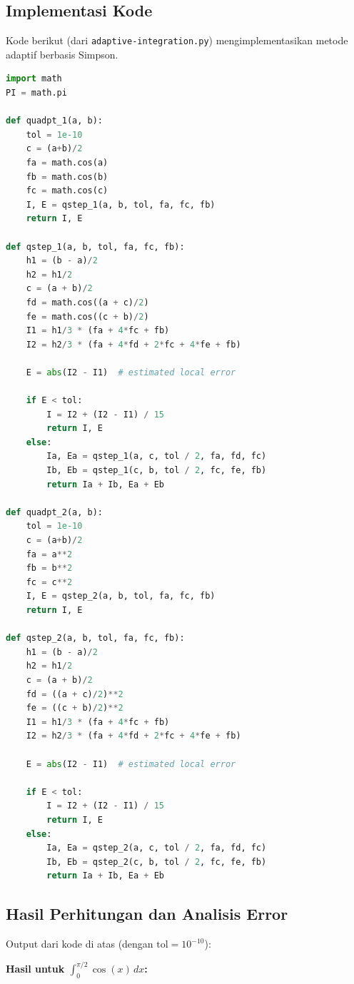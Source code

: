 \documentclass[a4paper, 11pt]{article} %
\begin{document}
\subsection{Implementasi Kode} %
Kode berikut (dari \texttt{adaptive-integration.py}) mengimplementasikan metode adaptif berbasis Simpson. %
\begin{lstlisting}[language=Python, caption={Fungsi adaptive-integration.py}, label=list:adaptive]
import math
PI = math.pi

def quadpt_1(a, b):
    tol = 1e-10
    c = (a+b)/2
    fa = math.cos(a)
    fb = math.cos(b)
    fc = math.cos(c)
    I, E = qstep_1(a, b, tol, fa, fc, fb)
    return I, E

def qstep_1(a, b, tol, fa, fc, fb):
    h1 = (b - a)/2
    h2 = h1/2
    c = (a + b)/2
    fd = math.cos((a + c)/2)
    fe = math.cos((c + b)/2)
    I1 = h1/3 * (fa + 4*fc + fb)
    I2 = h2/3 * (fa + 4*fd + 2*fc + 4*fe + fb)

    E = abs(I2 - I1)  # estimated local error
    
    if E < tol:
        I = I2 + (I2 - I1) / 15
        return I, E
    else:
        Ia, Ea = qstep_1(a, c, tol / 2, fa, fd, fc)
        Ib, Eb = qstep_1(c, b, tol / 2, fc, fe, fb)
        return Ia + Ib, Ea + Eb

def quadpt_2(a, b):
    tol = 1e-10
    c = (a+b)/2
    fa = a**2
    fb = b**2
    fc = c**2
    I, E = qstep_2(a, b, tol, fa, fc, fb)
    return I, E

def qstep_2(a, b, tol, fa, fc, fb):
    h1 = (b - a)/2
    h2 = h1/2
    c = (a + b)/2
    fd = ((a + c)/2)**2
    fe = ((c + b)/2)**2
    I1 = h1/3 * (fa + 4*fc + fb)
    I2 = h2/3 * (fa + 4*fd + 2*fc + 4*fe + fb)

    E = abs(I2 - I1)  # estimated local error
    
    if E < tol:
        I = I2 + (I2 - I1) / 15
        return I, E
    else:
        Ia, Ea = qstep_2(a, c, tol / 2, fa, fd, fc)
        Ib, Eb = qstep_2(c, b, tol / 2, fc, fe, fb)
        return Ia + Ib, Ea + Eb
\end{lstlisting} 

\subsection{Hasil Perhitungan dan Analisis Error} %
Output dari kode di atas (dengan $\text{tol} = 10^{-10}$): %

\textbf{Hasil untuk $\int_0^{\pi/2} \cos(x) \, dx$:} %
\end{document}

